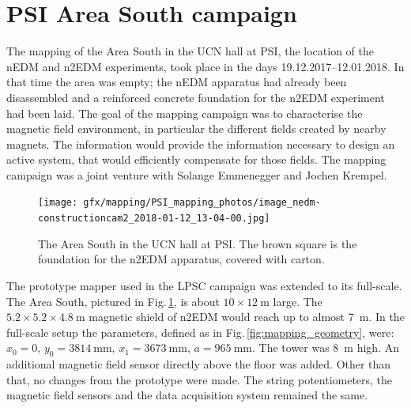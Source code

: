 \section{PSI Area South campaign}
The mapping of the Area South in the UCN hall at PSI, the location of the nEDM and n2EDM experiments, took place in the days 19.12.2017--12.01.2018.
In that time the area was empty; the nEDM apparatus had already been disassembled and a reinforced concrete foundation for the n2EDM experiment had been laid.
The goal of the mapping campaign was to characterise the magnetic field environment, in particular the different fields created by nearby magnets.
The information would provide the information necessary to design an active system, that would efficiently compensate for those fields.
The mapping campaign was a joint venture with Solange Emmenegger and Jochen Krempel.

\begin{figure}
  \centering
  \texttt{[image: gfx/mapping/PSI\_mapping\_photos/image\_nedm-constructioncam2\_2018-01-12\_13-04-00.jpg]}
  \caption{The Area South in the UCN hall at PSI\@.
  The brown square is the foundation for the n2EDM apparatus, covered with carton.
  }\label{fig:mapping_photo}
\end{figure}

The prototype mapper used in the LPSC campaign was extended to its full-scale.
The Area South, pictured in Fig.\,\ref{fig:mapping_photo}, is about $10 \times \SI{12}{\metre}$ large.
The $5.2 \times 5.2 \times \SI{4.8}{\metre}$ magnetic shield of n2EDM would reach up to almost \SI{7}{\metre}.
In the full-scale setup the parameters, defined as in Fig.\,\ref{fig:mapping_geometry}, were:
$x_0 = 0$, $y_0 = \SI{3814}{\milli\metre}$, $x_1 = \SI{3673}{\milli\metre}$, $a = \SI{965}{\milli\metre}$.
The tower was \SI{8}{\metre} high.
An additional magnetic field sensor directly above the floor was added.
Other than that, no changes from the prototype were made.
The string potentiometers, the magnetic field sensors and the data acquisition system remained the same.

